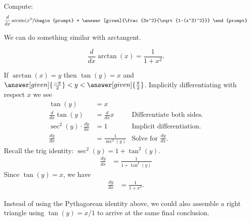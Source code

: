 \documentclass{ximera}
\begin{document}
\begin{question}
  Compute:
  \[
  \frac{d}{dx} \arcsin(x^3)
  \begin{prompt}
    = \answer[given]{\frac{3x^2}{\sqrt{1-(x^3)^2}}}
  \end{prompt}
  \]
\end{question}



We can do something similar with arctangent. 


\begin{theorem}
  \[
  \frac{d}{dx} \arctan(x) = \frac{1}{1+x^2}.
  \]
  \begin{explanation} 
    If
    \(
    \arctan(x) = y
    \)
    then $\tan(y) = x$ and $\answer[given]{\frac{-\pi}{2}}<
    y< \answer[given]{\frac{\pi}{2}}$.  Implicitly
    differentiating with respect $x$ we see
    \begin{align*}
      \tan(y) &= x\\
      \frac{d}{dx} \tan(y) &= \frac{d}{dx} x         &\text{Differentiate both sides.}\\
      \sec^2(y) \cdot \frac{dy}{dx} &= 1   &\text{Implicit differentiation.}\\
     \frac{dy}{dx} &= \frac{1}{\sec^2(y)}   &\text{Solve for $\frac{dy}{dx}$.}
       \end{align*}
      Recall the trig identity:  $\sec^2(y)=1+\tan^2(y)$.\\
        \begin{align*}
          \frac{dy}{dx} &= \frac{1}{1+\tan^2(y)} 
         \end{align*}
         Since  $\tan(y) = x$, we have\\
          \begin{align*}
          \frac{dy}{dx} &= \frac{1}{1+x^2} .
         \end{align*}
         
         Instead of using the Pythagorean identity above, we could also assemble a right triangle using $\tan(y)=x/1$ to arrive at the same final conclusion.
        

\end{explanation}
\end{theorem}
\end{document}
